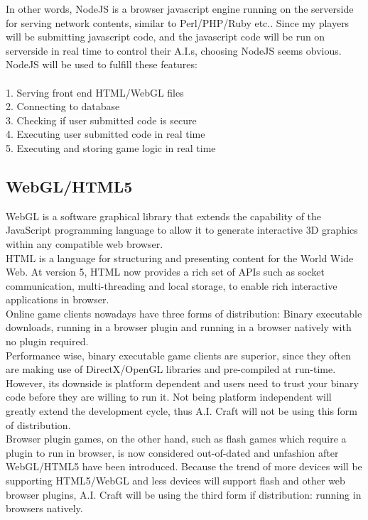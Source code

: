 \documentclass[12pt]{article}
\begin{document}
In other words, NodeJS is a browser javascript engine running on the serverside for serving network contents, similar to Perl/PHP/Ruby etc.. Since my players will be submitting javascript code, and the javascript code will be run on serverside in real time to control their A.I.s, choosing NodeJS seems obvious. NodeJS will be used to fulfill these features:\\
\\
1. Serving front end HTML/WebGL files\\
2. Connecting to database\\
3. Checking if user submitted code is secure\\
4. Executing user submitted code in real time\\
5. Executing and storing game logic in real time\\

\subsection{WebGL/HTML5}
WebGL is a software graphical library that extends the capability of the JavaScript programming language to allow it to generate interactive 3D graphics within any compatible web browser. \\

HTML is a language for structuring and presenting content for the World Wide Web. At version 5, HTML now provides a rich set of APIs such as socket communication, multi-threading and local storage, to enable rich interactive applications in browser.\\

Online game clients nowadays have three forms of distribution: Binary executable downloads, running in a browser plugin and running in a browser natively with no plugin required.\\ 

Performance wise, binary executable game clients are superior, since they often are making use of DirectX/OpenGL libraries and pre-compiled at run-time. However, its downside is platform dependent and users need to trust your binary code before they are willing to run it. Not being platform independent will greatly extend the development cycle, thus A.I. Craft will not be using this form of distribution.\\ 

Browser plugin games, on the other hand, such as flash games which require a plugin to run in browser, is now considered out-of-dated and unfashion after WebGL/HTML5 have been introduced. Because the trend of more devices will be supporting HTML5/WebGL and less devices will support flash and other web browser plugins, A.I. Craft will be using the third form if distribution: running in browsers natively.\\ 
\end{document}
